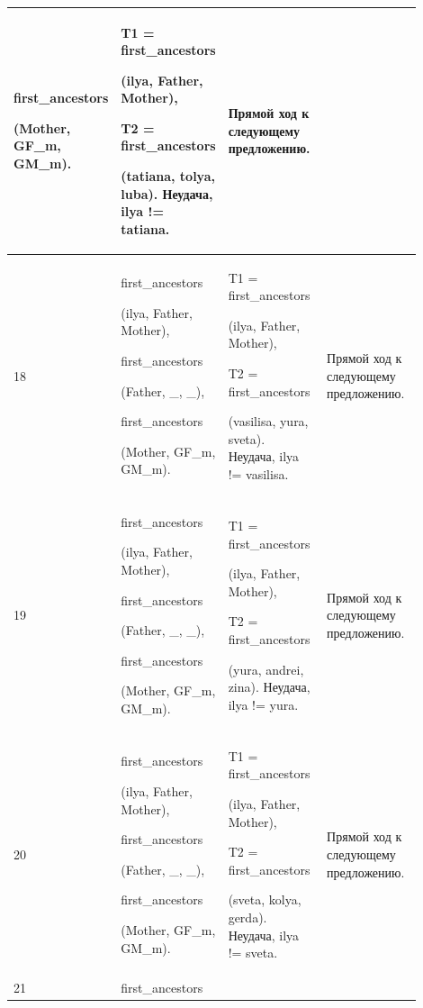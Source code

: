 \documentclass[a4paper,12pt]{article}
\begin{document}
\begin{center}
\begin{longtable}[h!]{|p{0.05\linewidth}|p{0.25\linewidth}|p{ 0.3\linewidth}|p{ 0.3\linewidth}|}
{				first\_ancestors
				
				(Mother, GF\_m, GM\_m).} & {T1 = first\_ancestors
				
				(ilya, Father, Mother),
				
				T2 = first\_ancestors
				
				(tatiana, tolya, luba). Неудача, ilya != tatiana.} & {Прямой ход к следующему предложению.}\\
			\hline
			{18} & {first\_ancestors
				
				(ilya, Father, Mother),
				
				first\_ancestors
				
				(Father, \_, \_),
				
				first\_ancestors
				
				(Mother, GF\_m, GM\_m).} & {T1 = first\_ancestors
				
				(ilya, Father, Mother),
				
				T2 = first\_ancestors
				
				(vasilisa, yura, sveta). Неудача, ilya != vasilisa.} & {Прямой ход к следующему предложению.}\\
			\hline
			{19} & {first\_ancestors
				
				(ilya, Father, Mother),
				
				first\_ancestors
				
				(Father, \_, \_),
				
				first\_ancestors
				
				(Mother, GF\_m, GM\_m).} & {T1 = first\_ancestors
				
				(ilya, Father, Mother),
				
				T2 = first\_ancestors
				
				(yura, andrei, zina). Неудача, ilya != yura.} & {Прямой ход к следующему предложению.}\\
			\hline
			{20} & {first\_ancestors
				
				(ilya, Father, Mother),
				
				first\_ancestors
				
				(Father, \_, \_),
				
				first\_ancestors
				
				(Mother, GF\_m, GM\_m).} & {T1 = first\_ancestors
				
				(ilya, Father, Mother),
				
				T2 = first\_ancestors
				
				(sveta, kolya, gerda). Неудача, ilya != sveta.} & {Прямой ход к следующему предложению.}\\
			\hline
			{21} & {first\_ancestors
				
}
\end{longtable}
\end{center}
\end{document}
